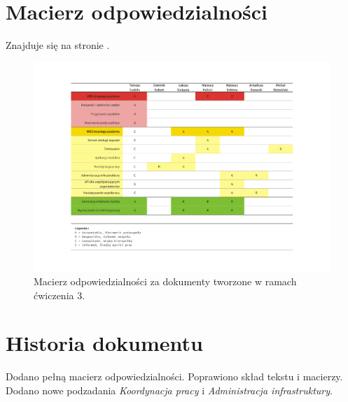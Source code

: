 \documentclass[10pt]{dokument-ppi}
\begin{document}
\Meta
{}
\MakeDokumentMeta


\section{Macierz odpowiedzialności}

Znajduje się na stronie \pageref{fig:macierz}.
\begin{figure}[h!]
    \includegraphics[trim=3cm 2cm 3cm 2cm,angle=270,width=\textwidth]{./figury/macierz-odpowiedzialnosci}
    \caption{Macierz odpowiedzialności za dokumenty tworzone w ramach ćwiczenia 3.}
    \label{fig:macierz}
\end{figure}


\section{Historia dokumentu}
\begin{versions}
        Dodano pełną macierz odpowiedzialności.
        Poprawiono skład tekstu i macierzy.
        Dodano nowe podzadania \emph{Koordynacja pracy} i \emph{Administracja infrastruktury}.
\end{versions}
\end{document}
